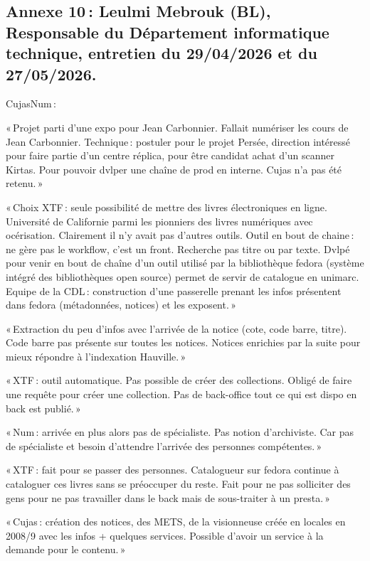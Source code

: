 \subsection*{Annexe 10 : Leulmi Mebrouk (BL), Responsable du Département informatique technique, entretien du 29/04/2026 et du 27/05/2026.}

CujasNum : 

« Projet parti d’une expo pour Jean Carbonnier. Fallait numériser les cours de Jean Carbonnier. Technique : postuler pour le projet Persée, direction intéressé pour faire partie d’un centre réplica, pour être candidat achat d’un scanner Kirtas. Pour pouvoir dvlper une chaîne de prod en interne. Cujas n’a pas été retenu. » 

« Choix XTF : seule possibilité de mettre des livres électroniques en ligne. Université de Californie parmi les pionniers des livres numériques avec océrisation. Clairement il n’y avait pas d’autres outils. Outil en bout de chaine : ne gère pas le workflow, c’est un front. Recherche pas titre ou par texte. Dvlpé pour venir en bout de chaîne d’un outil utilisé par la bibliothèque fedora (système intégré des bibliothèques open source) permet de servir de catalogue en unimarc. Equipe de la CDL : construction d’une passerelle prenant les infos présentent dans fedora (métadonnées, notices) et les exposent. » 

« Extraction du peu d’infos avec l’arrivée de la notice (cote, code barre, titre). Code barre pas présente sur toutes les notices. Notices enrichies par la suite pour mieux répondre à l’indexation Hauville. » 

« XTF : outil automatique. Pas possible de créer des collections. Obligé de faire une requête pour créer une collection. Pas de back-office tout ce qui est dispo en back est publié. » 

« Num : arrivée en plus alors pas de spécialiste. Pas notion d’archiviste. Car pas de spécialiste et besoin d’attendre l’arrivée des personnes compétentes. » 

« XTF : fait pour se passer des personnes. Catalogueur sur fedora continue à cataloguer ces livres sans se préoccuper du reste. Fait pour ne pas solliciter des gens pour ne pas travailler dans le back mais de sous-traiter à un presta. » 

« Cujas : création des notices, des METS, de la visionneuse créée en locales en 2008/9 avec les infos + quelques services. Possible d’avoir un service à la demande pour le contenu. » 

